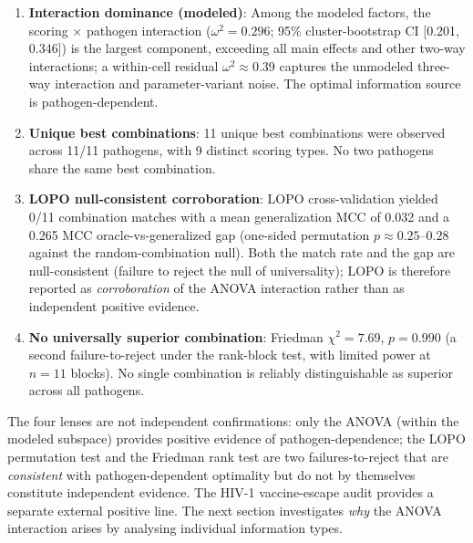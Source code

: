 \begin{enumerate}
\item \textbf{Interaction dominance (modeled)}: Among the modeled factors, the scoring $\times$ pathogen interaction ($\omega^2 = 0.296$; 95\% cluster-bootstrap CI [0.201, 0.346]) is the largest component, exceeding all main effects and other two-way interactions; a within-cell residual $\omega^2 \approx 0.39$ captures the unmodeled three-way interaction and parameter-variant noise. The optimal information source is pathogen-dependent.
\item \textbf{Unique best combinations}: 11 unique best combinations were observed across 11/11 pathogens, with 9 distinct scoring types. No two pathogens share the same best combination.
\item \textbf{LOPO null-consistent corroboration}: LOPO cross-validation yielded 0/11 combination matches with a mean generalization MCC of 0.032 and a 0.265 MCC oracle-vs-generalized gap (one-sided permutation $p \approx 0.25$--$0.28$ against the random-combination null). Both the match rate and the gap are null-consistent (failure to reject the null of universality); LOPO is therefore reported as \emph{corroboration} of the ANOVA interaction rather than as independent positive evidence.
\item \textbf{No universally superior combination}: Friedman $\chi^2 = 7.69$, $p = 0.990$ (a second failure-to-reject under the rank-block test, with limited power at $n = 11$ blocks). No single combination is reliably distinguishable as superior across all pathogens.
\end{enumerate}

The four lenses are not independent confirmations: only the ANOVA (within the modeled subspace) provides positive evidence of pathogen-dependence; the LOPO permutation test and the Friedman rank test are two failures-to-reject that are \emph{consistent} with pathogen-dependent optimality but do not by themselves constitute independent evidence. The HIV-1 vaccine-escape audit provides a separate external positive line. The next section investigates \textit{why} the ANOVA interaction arises by analysing individual information types.
\label{subsec:pahd_prototype} %

